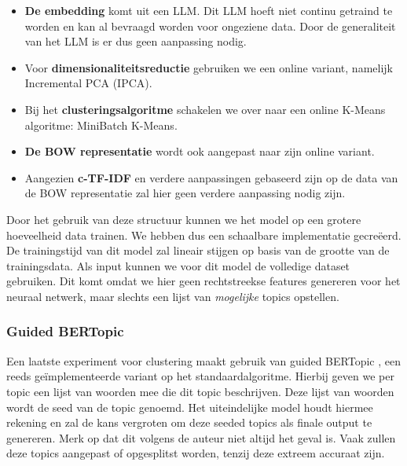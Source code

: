 \begin{itemize}
    \item \textbf{De embedding} komt uit een LLM. Dit LLM hoeft niet continu getraind te worden en kan al bevraagd worden voor ongeziene data. Door de generaliteit van het LLM is er dus geen aanpassing nodig.
    \item Voor \textbf{dimensionaliteitsreductie} gebruiken we een online variant, namelijk Incremental PCA (IPCA).
    \item Bij het \textbf{clusteringsalgoritme} schakelen we over naar een online K-Means algoritme: MiniBatch K-Means.
    \item \textbf{De BOW representatie} wordt ook aangepast naar zijn online variant.
    \item Aangezien \textbf{c-TF-IDF} en verdere aanpassingen gebaseerd zijn op de data van de BOW representatie zal hier geen verdere aanpassing nodig zijn.
\end{itemize}


Door het gebruik van deze structuur kunnen we het model op een grotere hoeveelheid data trainen. We hebben dus een schaalbare implementatie gecreëerd. De trainingstijd van dit model zal lineair stijgen op basis van de grootte van de trainingsdata. Als input kunnen we voor dit model de volledige dataset gebruiken. Dit komt omdat we hier geen rechtstreekse features genereren voor het neuraal netwerk, maar slechts een lijst van \textit{mogelijke} topics opstellen.

\subsubsection{Guided BERTopic}
Een laatste experiment voor clustering maakt gebruik van guided BERTopic \cite{bertopic_guided}, een reeds geïmplementeerde variant op het standaardalgoritme. Hierbij geven we per topic een lijst van woorden mee die dit topic beschrijven. Deze lijst van woorden wordt de seed van de topic genoemd. Het uiteindelijke model houdt hiermee rekening en zal de kans vergroten om deze seeded topics als finale output te genereren. Merk op dat dit volgens de auteur niet altijd het geval is. Vaak zullen deze topics aangepast of opgesplitst worden, tenzij deze extreem accuraat zijn.

